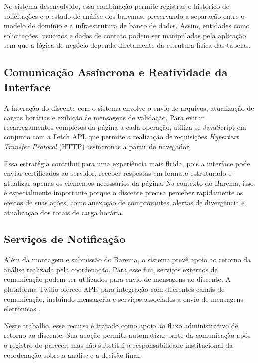 No sistema desenvolvido, essa combinação permite registrar o histórico de solicitações e o estado de análise dos baremas, preservando a separação entre o modelo de domínio e a infraestrutura de banco de dados. Assim, entidades como solicitações, usuários e dados de contato podem ser manipuladas pela aplicação sem que a lógica de negócio dependa diretamente da estrutura física das tabelas.

\subsection{Comunicação Assíncrona e Reatividade da Interface}

A interação do discente com o sistema envolve o envio de arquivos, atualização de cargas horárias e exibição de mensagens de validação. Para evitar recarregamentos completos da página a cada operação, utiliza-se JavaScript em conjunto com a Fetch API, que permite a realização de requisições \textit{Hypertext Transfer Protocol} (HTTP) assíncronas a partir do navegador.

Essa estratégia contribui para uma experiência mais fluida, pois a interface pode enviar certificados ao servidor, receber respostas em formato estruturado e atualizar apenas os elementos necessários da página. No contexto do Barema, isso é especialmente importante porque o discente precisa perceber rapidamente os efeitos de suas ações, como anexação de comprovantes, alertas de divergência e atualização dos totais de carga horária.

\subsection{Serviços de Notificação}

Além da montagem e submissão do Barema, o sistema prevê apoio ao retorno da análise realizada pela coordenação. Para esse fim, serviços externos de comunicação podem ser utilizados para envio de mensagens ao discente. A plataforma Twilio oferece APIs para integração com diferentes canais de comunicação, incluindo mensageria e serviços associados a envio de mensagens eletrônicas \cite{twilio}.

Neste trabalho, esse recurso é tratado como apoio ao fluxo administrativo de retorno ao discente. Sua adoção permite automatizar parte da comunicação após o registro do parecer, mas não substitui a responsabilidade institucional da coordenação sobre a análise e a decisão final.

